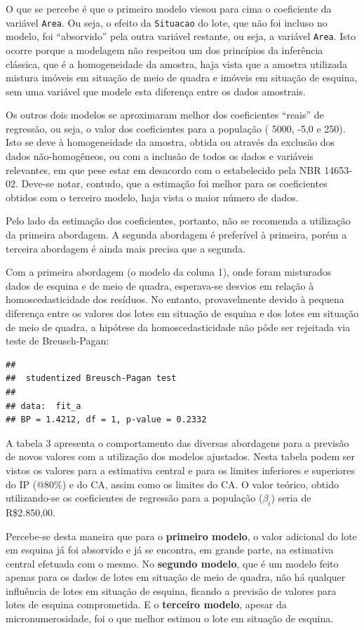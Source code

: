 \documentclass[
  a4paper, 11pt]{article}
\begin{document}
O que se percebe é que o primeiro modelo viesou para cima o coeficiente
da variável \texttt{Area}. Ou seja, o efeito da \texttt{Situacao} do
lote, que não foi incluso no modelo, foi ``absorvido'' pela outra
variável restante, ou seja, a variável \texttt{Area}. Isto ocorre porque
a modelagem não respeitou um dos princípios da inferência clássica, que
é a homogeneidade da amostra, haja vista que a amostra utilizada mistura
imóveis em situação de meio de quadra e imóveis em situação de esquina,
sem uma variável que modele esta diferença entre os dados amostrais.

Os outros dois modelos se aproximaram melhor dos coeficientes ``reais''
de regressão, ou seja, o valor dos coeficientes para a população ( 5000,
-5,0 e 250). Isto se deve à homogeneidade da amostra, obtida ou através
da exclusão dos dados não-homogêneos, ou com a inclusão de todos os
dados e variáveis relevantes, em que pese estar em desacordo com o
estabelecido pela NBR 14653-02. Deve-se notar, contudo, que a estimação
foi melhor para os coeficientes obtidos com o terceiro modelo, haja
vista o maior número de dados.

Pelo lado da estimação dos coeficientes, portanto, não se recomenda a
utilização da primeira abordagem. A segunda abordagem é preferível à
primeira, porém a terceira abordagem é ainda mais precisa que a segunda.

Com a primeira abordagem (o modelo da coluna 1), onde foram misturados
dados de esquina e de meio de quadra, esperava-se desvios em relação à
homoscedasticidade dos resíduos. No entanto, provavelmente devido à
pequena diferença entre os valores dos lotes em situação de esquina e
dos lotes em situação de meio de quadra, a hipótese da
homoscedasticidade não pôde ser rejeitada via teste de Breusch-Pagan:

\begin{verbatim}
## 
##  studentized Breusch-Pagan test
## 
## data:  fit_a
## BP = 1.4212, df = 1, p-value = 0.2332
\end{verbatim}

A tabela 3 apresenta o comportamento das diversas abordagens para a
previsão de novos valores com a utilização dos modelos ajustados. Nesta
tabela podem ser vistos os valores para a estimativa central e para os
limites inferiores e superiores do IP (@80\%) e do CA, assim como os
limites do CA. O valor teórico, obtido utilizando-se os coeficientes de
regressão para a população (\(\beta_i\)) seria de R\$2.850,00.

Percebe-se desta maneira que para o \textbf{primeiro modelo}, o valor
adicional do lote em esquina já foi absorvido e já se encontra, em
grande parte, na estimativa central efetuada com o mesmo. No
\textbf{segundo modelo}, que é um modelo feito apenas para os dados de
lotes em situação de meio de quadra, não há qualquer influência de lotes
em situação de esquina, ficando a previsão de valores para lotes de
esquina comprometida. E o \textbf{terceiro modelo}, apesar da
micronumerosidade, foi o que melhor estimou o lote em situação de
esquina.
\end{document}
